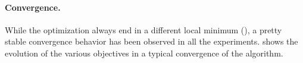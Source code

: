 \paragraph{Convergence.}
While the optimization always end in a different local minimum (), a pretty stable convergence behavior has been observed in all the experiments.  shows the evolution of the various objectives in a typical convergence of the algorithm.







